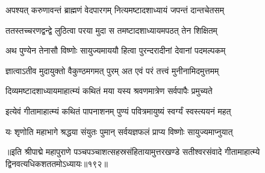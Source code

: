 \twolineshloka
{अपश्यत् करुणावन्तं ब्राह्मणं वेदपारगम्}
{नित्यमष्टादशाध्यायं जपन्तं दान्तचेतसम्} %

\twolineshloka
{ततस्तच्चरणद्वन्द्वे लुठित्वा परया मुदा}
{स तमष्टादशाध्यायमपठत् तेन शिक्षितम्} %

\twolineshloka
{अथ पुण्येन तेनासौ विष्णोः सायुज्यमाययौ}
{हित्वा पुरन्दरादीनां देवानां पदमल्पकम्} %

\twolineshloka
{ज्ञात्वाऽतीव मुदायुक्तो वैकुण्ठमगमत् पुरम्}
{अत एवं परं तत्त्वं मुनीनामिदमुत्तमम्} %

\twolineshloka
{दिव्यमष्टादशाध्यायमाहात्म्यं कथितं मया}
{यस्य श्रवणमात्रेण सर्वपापैः प्रमुच्यते} %

\twolineshloka
{इत्येवं गीतामाहात्म्यं कथितं पापनाशनम्}
{पुण्यं पवित्रमायुष्यं स्वर्ग्यं स्वस्त्ययनं महत्} %

\twolineshloka
{यः शृणोति महाभागे श्रद्धया संयुतः पुमान्}
{सर्वयज्ञफलं प्राप्य विष्णोः सायुज्यमाप्नुयात्} %

॥इति श्रीपाद्मे महापुराणे पञ्चपञ्चाशत्सहस्रसंहितायामुत्तरखण्डे सतीश्वरसंवादे गीतामाहात्म्ये द्विनवत्यधिकशततमोऽध्यायः॥१९२॥

\genMangalaShloka

\closesection

